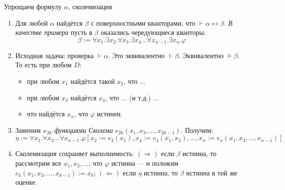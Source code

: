 \documentclass[aspectratio=169]{beamer}
\begin{document}
\begin{frame}{Упрощаем формулу $\alpha$, сколемизация}
\begin{enumerate}
\item Для любой $\alpha$ найдётся $\beta$ с поверхностными кванторами, что $\vdash\alpha \leftrightarrow \beta$.
\emph{В качестве примера} пусть в $\beta$ оказались чередующиеся кванторы:
$$\beta := \forall x_1.\exists x_2.\forall x_3.\exists x_4\dots \forall x_{n-1}.\exists x_n.\varphi$$

\item Исходная задача: проверка $\vdash\alpha$. Это эквивалентно $\vdash\beta$. Эквивалентно $\models\beta$.
То есть при любом $D$:
\begin{itemize}
\item при любом $x_1$ найдётся такой $x_2$, что ...
\item при любом $x_3$ найдётся $x_4$, что ... (и т.д.) ...
\item что найдётся $x_n$, что $\varphi$ истинен.
\end{itemize}

\item Заменим $x_{2k}$ \emph{функциями Сколема} $e_{2k}(x_1,x_3,\dots,x_{2k-1})$.
Получим: $$\eta := \forall x_1.\forall x_3\dots\forall x_{n-1}.\varphi[x_2:=e_2(x_1), x_4:=e_4(x_1,x_3), \dots, x_n := e_n(x_1,x_3,\dots,x_{n-1})]$$


\item Сколемизация сохраняет выполнимость: 
$(\Rightarrow)$ если $\beta$ истинна, то рассмотрим все $x_1,x_2,\dots$, что $\varphi$ истинна ---
и положим $e_k(x_1,x_3,\dots,x_{k-1}) := x_k$;
$(\Leftarrow)$ если $\eta$ истинна, то $\beta$ истинна в той же оценке.

\end{enumerate}
\end{frame}
\end{document}
